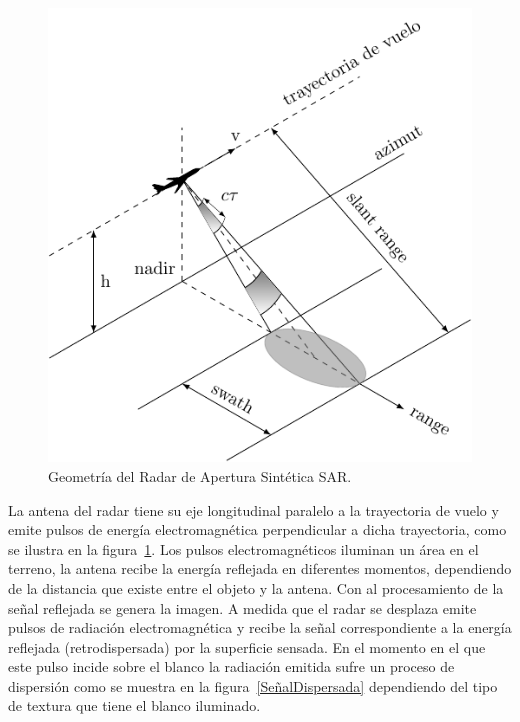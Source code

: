 \begin{figure}[hbt]
	\centering    
	\includegraphics[scale=1]{../../Figures/Tesis/Capitulo3/sar_3d.pdf}
	\caption{\label{GeometriaSAR}Geometría del Radar de Apertura Sintética SAR.} %
\end{figure} 

La antena del radar tiene su eje longitudinal paralelo a la trayectoria de vuelo y emite pulsos de energía electromagnética perpendicular a dicha trayectoria, como se ilustra en la figura~\ref{GeometriaSAR}. Los pulsos electromagnéticos iluminan un área en el terreno, la antena recibe la energía reflejada en diferentes momentos, dependiendo de la distancia que existe entre el objeto y la antena. Con  al procesamiento de la señal reflejada se genera la imagen. 
A medida que el radar se desplaza emite pulsos de radiación electromagnética y recibe la señal correspondiente a la energía reflejada (retrodispersada)  por la superficie sensada. En el momento en el que este pulso incide sobre el blanco la radiación emitida sufre un proceso de dispersión como se muestra en la figura~\ref{SeñalDispersada} dependiendo del tipo de textura que tiene el blanco iluminado. 

